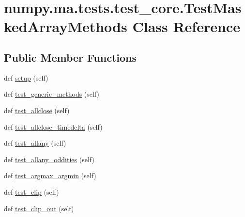 \hypertarget{classnumpy_1_1ma_1_1tests_1_1test__core_1_1TestMaskedArrayMethods}{}\section{numpy.\+ma.\+tests.\+test\+\_\+core.\+Test\+Masked\+Array\+Methods Class Reference}
\label{classnumpy_1_1ma_1_1tests_1_1test__core_1_1TestMaskedArrayMethods}
\subsection*{Public Member Functions}
\begin{DoxyCompactItemize}
\item 
def \hyperlink{classnumpy_1_1ma_1_1tests_1_1test__core_1_1TestMaskedArrayMethods_aff8a11daf44031b7093b0db899c6008a}{setup} (self)
\item 
def \hyperlink{classnumpy_1_1ma_1_1tests_1_1test__core_1_1TestMaskedArrayMethods_a4de49471ce8cac95f595a678d01ce916}{test\+\_\+generic\+\_\+methods} (self)
\item 
def \hyperlink{classnumpy_1_1ma_1_1tests_1_1test__core_1_1TestMaskedArrayMethods_a9ec1fb6b0c427018b2fd05a60c1c00cd}{test\+\_\+allclose} (self)
\item 
def \hyperlink{classnumpy_1_1ma_1_1tests_1_1test__core_1_1TestMaskedArrayMethods_a10273b6873d98d63a239f957d861e9a9}{test\+\_\+allclose\+\_\+timedelta} (self)
\item 
def \hyperlink{classnumpy_1_1ma_1_1tests_1_1test__core_1_1TestMaskedArrayMethods_a263955e11829402398435ac5279c05f7}{test\+\_\+allany} (self)
\item 
def \hyperlink{classnumpy_1_1ma_1_1tests_1_1test__core_1_1TestMaskedArrayMethods_a8ca40676254398483a99f3d2962c04b4}{test\+\_\+allany\+\_\+oddities} (self)
\item 
def \hyperlink{classnumpy_1_1ma_1_1tests_1_1test__core_1_1TestMaskedArrayMethods_a89e895cf5d127efdf55ab3cdb2dc8c2a}{test\+\_\+argmax\+\_\+argmin} (self)
\item 
def \hyperlink{classnumpy_1_1ma_1_1tests_1_1test__core_1_1TestMaskedArrayMethods_a57b936c8cead8543ddc1b0cae24ceb9a}{test\+\_\+clip} (self)
\item 
def \hyperlink{classnumpy_1_1ma_1_1tests_1_1test__core_1_1TestMaskedArrayMethods_adc66ccbf4de838d4179ef9ce4961e98d}{test\+\_\+clip\+\_\+out} (self)
\item 

\end{DoxyCompactItemize}
